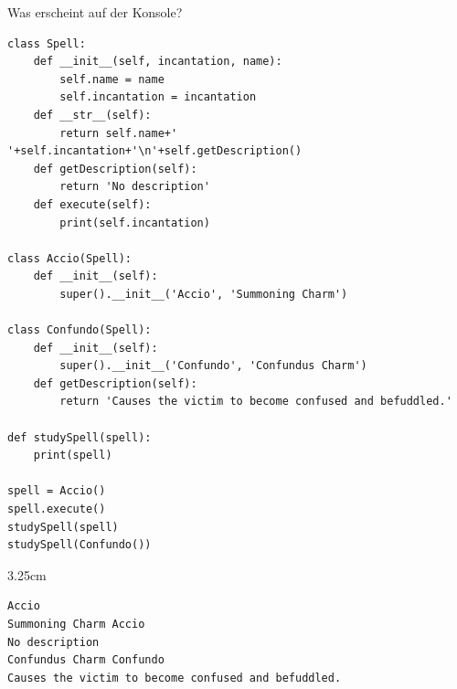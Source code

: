 \question[8]
Was erscheint auf der Konsole?
\begin{lstlisting}
class Spell:
    def __init__(self, incantation, name):
        self.name = name
        self.incantation = incantation
    def __str__(self):
        return self.name+' '+self.incantation+'\n'+self.getDescription()
    def getDescription(self):
        return 'No description'
    def execute(self):
        print(self.incantation)

class Accio(Spell):
    def __init__(self):
        super().__init__('Accio', 'Summoning Charm')

class Confundo(Spell):
    def __init__(self):
        super().__init__('Confundo', 'Confundus Charm')
    def getDescription(self):
        return 'Causes the victim to become confused and befuddled.'

def studySpell(spell):
    print(spell)

spell = Accio()
spell.execute()
studySpell(spell)
studySpell(Confundo())
\end{lstlisting}


\begin{solutionbox}{3.25cm}
\begin{lstlisting}
Accio
Summoning Charm Accio
No description
Confundus Charm Confundo
Causes the victim to become confused and befuddled.
\end{lstlisting}
\end{solutionbox}

